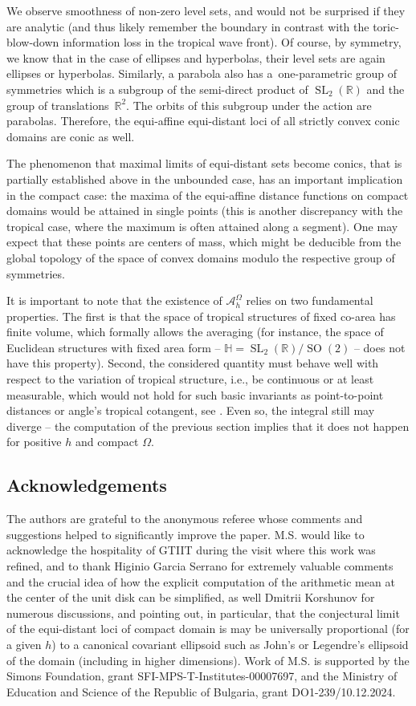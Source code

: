 \documentclass[pdftex]{sigma}
\numberwithin{equation}{section}
\theoremstyle{definition}
\renewcommand\H{\mathbb H}
\newcommand\SL{\operatorname{SL}}
\begin{document}
We observe smoothness of non-zero level sets, and would not be surprised if they are analytic (and thus likely remember the boundary in contrast with the toric-blow-down information loss in the tropical wave front). Of course, by symmetry, we know that in the case of ellipses and hyperbolas, their level sets are again ellipses or hyperbolas. Similarly, a parabola also has a~one-parametric group of symmetries which is a subgroup of the semi-direct product of $\operatorname{SL}_2(\mathbb{R})$ and the group of translations~$\mathbb{R}^2$. The orbits of this subgroup under the action are parabolas. Therefore, the equi-affine equi-distant loci of all strictly convex conic domains are conic as well.

The phenomenon that maximal limits of equi-distant sets become conics, that is partially established above in the unbounded case, has an important implication in the compact case: the maxima of the equi-affine distance functions on compact domains would be attained in single points (this is another discrepancy with the tropical case, where the maximum is often attained along a segment). One may expect that these points are centers of mass, which might be deducible from the global topology of the space of convex domains modulo the respective group of symmetries.

It is important to note that the existence of $\mathcal{A}_h^\Omega$ relies on two fundamental properties. The first is that the space of tropical structures of fixed co-area has finite volume, which formally allows the averaging (for instance, the space of Euclidean structures with fixed area form -- $\H=\SL_2(\mathbb{R})/\operatorname{SO}(2)$ -- does not have this property). Second, the considered quantity must behave well with respect to the variation of tropical structure, i.e., be continuous or at least measurable, which would not hold for such basic invariants as point-to-point distances or angle's tropical cotangent, see \cite{mikhalkin2023wave}. Even so, the integral still may diverge -- the computation of the previous section implies that it does not happen for positive $h$ and compact $\Omega$.

\subsection*{Acknowledgements}
The authors are grateful to the anonymous referee whose comments and suggestions helped to significantly improve the paper.
M.S. would like to acknowledge the hospitality of GTIIT during the visit where this work was refined, and to thank Higinio Garcia Serrano for extremely valuable comments and the crucial idea of how the explicit computation of the arithmetic mean at the center of the unit disk can be simplified, as well Dmitrii Korshunov for numerous discussions, and pointing out, in particular, that the conjectural limit of the equi-distant loci of compact domain is may be universally proportional (for a given $h$) to a canonical covariant ellipsoid such as John's or Legendre's ellipsoid of the domain (including in higher dimensions). Work of M.S. is supported by the Simons Foundation, grant SFI-MPS-T-Institutes-00007697, and the Ministry of Education and Science of the Republic of Bulgaria, grant DO1-239/10.12.2024.
\end{document}
